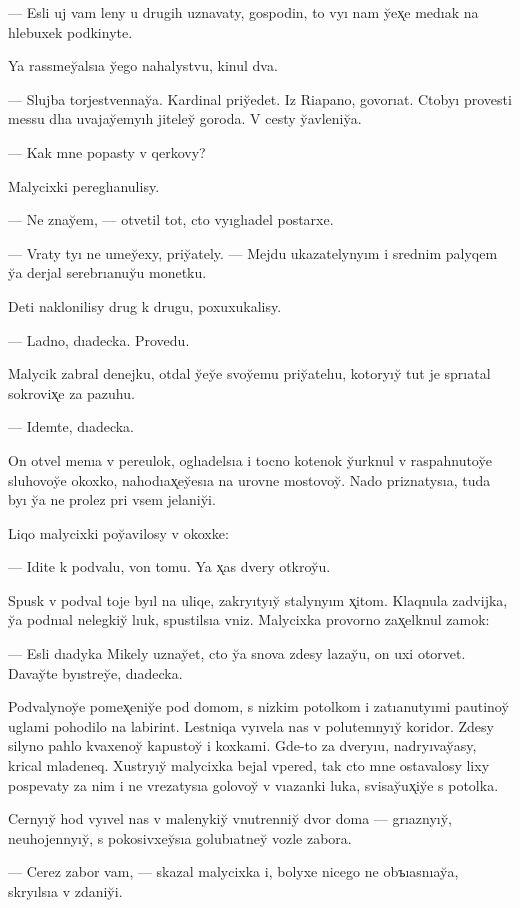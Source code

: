 \documentclass[10pt]{book}
\begin{document}
— Esli uj vam leny u drugih uznavaty, gospodin, to vyı nam y̆ex̨e medıak na hlebuxek podkinyte.

Ya rassmey̆alsıa y̆ego nahalystvu, kinul dva.

— Slujba torjestvennay̆a. Kardinal priy̆edet. Iz Riapano, govorıat. Ctobyı provesti messu dlıa uvajay̆emyıh jiteley̆ goroda. V cesty y̆avleniy̆a.

— Kak mne popasty v qerkovy?

Malycixki pereglıanulisy.

— Ne znay̆em, — otvetil tot, cto vyıglıadel postarxe.

— Vraty tyı ne umey̆exy, priy̆ately. — Mejdu ukazatelynyım i srednim palyqem y̆a derjal serebrıanuy̆u monetku.

Deti naklonilisy drug k drugu, poxuxukalisy.

— Ladno, dıadecka. Provedu.

Malycik zabral denejku, otdal y̆ey̆e svoy̆emu priy̆atelıu, kotoryıy̆ tut je sprıatal sokrovix̨e za pazuhu.

— Idemte, dıadecka.

On otvel menıa v pereulok, oglıadelsıa i tocno kotenok y̆urknul v raspahnutoy̆e sluhovoy̆e okoxko, nahodıax̨ey̆esıa na urovne mostovoy̆. Nado priznatysıa, tuda byı y̆a ne prolez pri vsem jelaniy̆i.

Liqo malycixki poy̆avilosy v okoxke:

— Idite k podvalu, von tomu. Ya x̨as dvery otkroy̆u.

Spusk v podval toje byıl na uliqe, zakryıtyıy̆ stalynyım x̨itom. Klaqnula zadvijka, y̆a podnıal nelegkiy̆ lıuk, spustilsıa vniz. Malycixka provorno zax̨elknul zamok:

— Esli dıadyka Mikely uznay̆et, cto y̆a snova zdesy lazay̆u, on uxi otorvet. Davay̆te byıstrey̆e, dıadecka.

Podvalynoy̆e pomex̨eniy̆e pod domom, s nizkim potolkom i zatıanutyımi pautinoy̆ uglami pohodilo na labirint. Lestniqa vyıvela nas v polutemnyıy̆ koridor. Zdesy silyno pahlo kvaxenoy̆ kapustoy̆ i koxkami. Gde-to za dveryıu, nadryıvay̆asy, krical mladeneq. Xustryıy̆ malycixka bejal vpered, tak cto mne ostavalosy lixy pospevaty za nim i ne vrezatysıa golovoy̆ v vıazanki luka, svisay̆ux̨iy̆e s potolka.

Cernyıy̆ hod vyıvel nas v malenykiy̆ vnutrenniy̆ dvor doma — grıaznyıy̆, neuhojennyıy̆, s pokosivxey̆sıa golubıatney̆ vozle zabora.

— Cerez zabor vam, — skazal malycixka i, bolyxe nicego ne obъıasnıay̆a, skryılsıa v zdaniy̆i.
\end{document}
